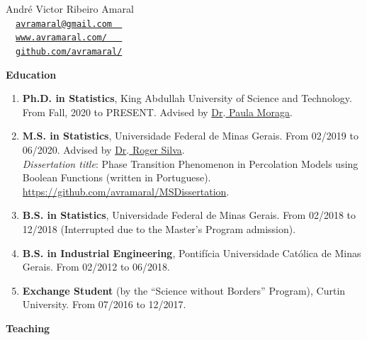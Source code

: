 \documentclass[11pt, ]{article}
\begin{document}
	
	\begin{center}
		{\LARGE André Victor Ribeiro Amaral} \\ \vspace{6pt}
		{\small\faEnvelope~~\href{mailto:avramaral@gmail.com}{\texttt{avramaral@gmail.com~~}}} \\
		{\small\faDesktop~~\href{https://www.avramaral.com/}{\texttt{www.avramaral.com/~~~}}}	\\
		{\small\faGithubAlt~~\href{https://github.com/avramaral/}{\texttt{github.com/avramaral/}}}	
	\end{center}

{\Large \textbf{Education}}

	\begin{enumerate}
		\item \textbf{Ph.D. in Statistics}, King Abdullah University of Science and Technology. From Fall, 2020 to PRESENT. Advised by \href{https://www.paulamoraga.com/}{Dr$\text{.}$ Paula Moraga}.
		
		\item \textbf{M.S. in Statistics}, Universidade Federal de Minas Gerais. From 02/2019 to 06/2020. Advised by \href{http://www.est.ufmg.br/~rogerwcs/}{Dr$\text{.}$ Roger Silva}. \\
		\textit{Dissertation title}: Phase Transition Phenomenon in Percolation Models using Boolean Functions (written in Portuguese). \href{https://github.com/avramaral/MSDissertation}{https://github.com/avramaral/MSDissertation}.
		
		\item \textbf{B.S. in Statistics}, Universidade Federal de Minas Gerais. From 02/2018 to 12/2018 (Interrupted due to the Master's Program admission).
		
		\item \textbf{B.S. in Industrial Engineering}, Pontifícia Universidade Católica de Minas Gerais. From 02/2012 to 06/2018.
		
		\item \textbf{Exchange Student} (by the ``Science without Borders'' Program), Curtin University. From 07/2016 to 12/2017.
	\end{enumerate}

\vspace{6pt}

{\Large \textbf{Teaching}}
\end{document}
